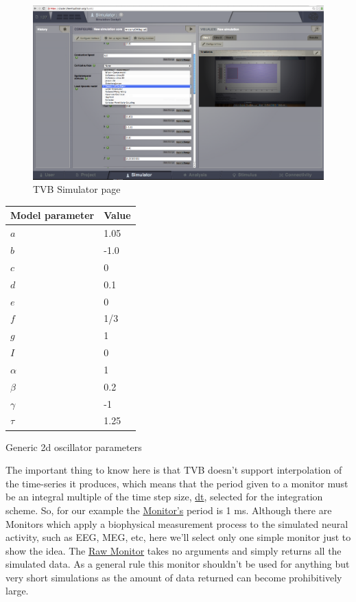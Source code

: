 \documentclass{tufte-handout}
\begin{document}
\begin{figure}[h]
  \includegraphics[width=\linewidth]{Handout_UI_BuildingYourOwnBrainNetworkModel_Model}%
  \caption{TVB Simulator page}%
  \label{fig:step_01}%
\end{figure}


\begin{margintable}
  \centering
  \selectfont
  \begin{tabular}{ll}
    \toprule
    Model parameter & Value         \\
    \midrule
             $a$        &   1.05   \\
             $b$        &  -1.0    \\
             $c$        &   0      \\
             $d$        &   0.1    \\
             $e$        &   0      \\
             $f$        &   1/3    \\
             $g$        &   1      \\
             $I$        &   0      \\
             $\alpha$   &   1      \\
             $\beta$    &   0.2    \\
             $\gamma$   &  -1      \\
             $\tau$     &   1.25   \\
    \bottomrule
  \end{tabular}
  \caption{Generic 2d oscillator parameters}
  \label{tab:modeltab}
\end{margintable}



The important thing to know here is that TVB doesn't support interpolation of
the time-series it produces, which means that the period given to a monitor
must be an integral multiple of the time step size, \underline{dt}, selected for the integration scheme.
So, for our example the \underline{Monitor's} period is 1 ms. 
Although there are Monitors which apply a biophysical measurement process to
the simulated neural activity, such as EEG, MEG, etc, here we'll select only
one simple monitor just to show the idea. The \underline{Raw Monitor} takes no arguments
and simply returns all the simulated data. As a general rule this monitor
shouldn't be used for anything but very short simulations as the amount of
data returned can become prohibitively large.
\end{document}
